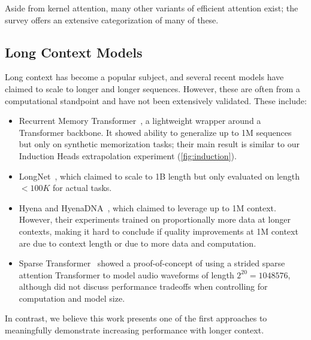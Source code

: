 Aside from kernel attention, many other variants of efficient attention exist; the survey \citet{tay2022efficient} offers an extensive categorization of many of these.


\subsection{Long Context Models}

Long context has become a popular subject, and several recent models have claimed to scale to longer and longer sequences.
However, these are often from a computational standpoint and have not been extensively validated.
These include:
\begin{itemize}[leftmargin=*,itemsep=0pt,topsep=0pt]
  \item Recurrent Memory Transformer~\citep{bulatov2023scaling}, a lightweight wrapper around a Transformer backbone. It showed ability to generalize up to 1M sequences but only on synthetic memorization tasks; their main result is similar to our Induction Heads extrapolation experiment (\cref{fig:induction}).
  \item LongNet~\citep{ding2023longnet}, which claimed to scale to 1B length but only evaluated on length $<100K$ for actual tasks.
  \item Hyena and HyenaDNA~\citep{poli2023hyena,nguyen2023hyenadna}, which claimed to leverage up to 1M context. However, their experiments trained on proportionally more data at longer contexts, making it hard to conclude if quality improvements at 1M context are due to context length or due to more data and computation.
  \item Sparse Transformer~\citep{child2019generating} showed a proof-of-concept of using a strided sparse attention Transformer to model audio waveforms of length $2^{20}=1048576$, although did not discuss performance tradeoffs when controlling for computation and model size.
\end{itemize}
In contrast, we believe this work presents one of the first approaches to meaningfully demonstrate increasing performance with longer context.


%

